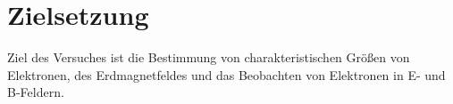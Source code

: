 \section{Zielsetzung}
\label{sec:Ziel}
Ziel des Versuches ist die Bestimmung von charakteristischen Größen von
Elektronen, des Erdmagnetfeldes und das Beobachten von Elektronen in E- und B-Feldern.
